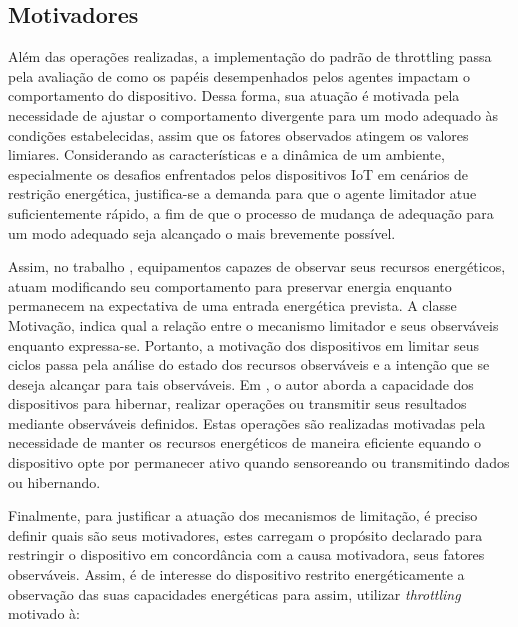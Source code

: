 \subsection{Motivadores}

Além das operações realizadas, a implementação do padrão de throttling passa pela avaliação de como os papéis desempenhados pelos agentes impactam o comportamento do dispositivo. Dessa forma, sua atuação é motivada pela necessidade de ajustar o comportamento divergente para um modo adequado às condições estabelecidas, assim que os fatores observados atingem os valores limiares. Considerando as características e a dinâmica de um ambiente, especialmente os desafios enfrentados pelos dispositivos \acs{IoT} em cenários de restrição energética, justifica-se a demanda para que o agente limitador atue suficientemente rápido, a fim de que o processo de mudança de adequação para um modo adequado seja alcançado o mais brevemente possível.

Assim, no trabalho \cite{zhang_toward_2018}, equipamentos capazes de observar seus recursos energéticos, atuam modificando seu comportamento para preservar energia enquanto permanecem na expectativa de uma entrada energética prevista. A classe Motivação, indica qual a relação entre o mecanismo limitador e seus observáveis enquanto expressa-se. Portanto, a motivação dos dispositivos em limitar seus ciclos passa pela análise do estado dos recursos observáveis e a intenção que se deseja alcançar para tais observáveis. Em , o autor aborda a capacidade dos dispositivos para hibernar, realizar operações ou transmitir seus resultados mediante observáveis definidos. Estas operações são realizadas motivadas pela necessidade de manter os recursos energéticos de maneira eficiente equando o dispositivo opte por permanecer ativo quando sensoreando ou transmitindo dados ou hibernando.


Finalmente, para justificar a atuação dos mecanismos de limitação, é preciso definir quais são seus motivadores, estes carregam o propósito declarado para restringir o dispositivo em concordância com a causa motivadora, seus fatores observáveis. Assim, é de interesse do dispositivo restrito energéticamente a observação das suas capacidades energéticas para assim, utilizar \textit{throttling} motivado à:

